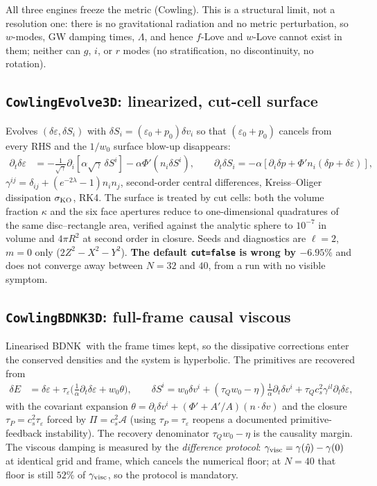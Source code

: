 \documentclass[aps,prd,preprint,amsmath,amssymb,nofootinbib,longbibliography]{revtex4-2}
\newcommand{\cs}{c_s}
\newcommand{\BDNK}{BDNK}
\begin{document}
All three engines freeze the metric (Cowling). This is a structural limit, not a resolution one:
there is no gravitational radiation and no metric perturbation, so $w$-modes, GW damping times,
$\Lambda$, and hence $f$-Love and $w$-Love cannot exist in them; neither can $g$, $i$, or $r$
modes (no stratification, no discontinuity, no rotation).

\subsection{\texttt{CowlingEvolve3D}: linearized, cut-cell surface}
Evolves $(\delta\varepsilon, \delta S_i)$ with $\delta S_i = (\varepsilon_0+p_0)\delta v_i$ so that
$(\varepsilon_0+p_0)$ cancels from every RHS and the $1/w_0$ surface blow-up disappears:
\begin{align}
\partial_t\delta\varepsilon &= -\frac{1}{\sqrt\gamma}\partial_i[\alpha\sqrt\gamma\,\delta S^i] - \alpha\Phi'(n_i\delta S^i),\qquad
\partial_t\delta S_i = -\alpha[\partial_i\delta p + \Phi' n_i(\delta p + \delta\varepsilon)],
\end{align}
$\gamma^{ij} = \delta_{ij} + (e^{-2\lambda}-1)n_in_j$, second-order central differences,
Kreiss--Oliger dissipation $\sigma_{\rm KO}$, RK4. The surface is treated by cut cells: both the
volume fraction $\kappa$ and the six face apertures reduce to one-dimensional quadratures of the
same disc--rectangle area, verified against the analytic sphere to $10^{-7}$ in volume and
$4\pi R^2$ at second order in closure. Seeds and diagnostics are $\ell=2$, $m=0$ only
($2Z^2-X^2-Y^2$). \textbf{The default \texttt{cut=false} is wrong by $-6.95\%$} and does not
converge away between $N=32$ and $40$, from a run with no visible symptom.

\subsection{\texttt{CowlingBDNK3D}: full-frame causal viscous}
Linearised \BDNK\ with the frame times kept, so the dissipative corrections enter the conserved
densities and the system is hyperbolic. The primitives are recovered from
\begin{align}
\delta E &= \delta\varepsilon + \tau_\varepsilon\big(\tfrac1\alpha\partial_t\delta\varepsilon + w_0\theta\big),\qquad
\delta S^i = w_0\delta v^i + (\tau_Qw_0-\eta)\tfrac1\alpha\partial_t\delta v^i + \tau_Q\cs^2\gamma^{il}\partial_l\delta\varepsilon,
\end{align}
with the covariant expansion $\theta = \partial_i\delta v^i + (\Phi' + A'/A)(n\cdot\delta v)$ and
the closure $\tau_P = \cs^2\tau_\varepsilon$ forced by $\Pi = \cs^2\mathcal A$ (using
$\tau_P = \tau_\varepsilon$ reopens a documented primitive-feedback instability). The recovery
denominator $\tau_Qw_0 - \eta$ is the causality margin. The viscous damping is measured by the
\emph{difference protocol}: $\gamma_{\rm visc} = \gamma(\hat\eta) - \gamma(0)$ at identical grid and
frame, which cancels the numerical floor; at $N=40$ that floor is still $52\%$ of
$\gamma_{\rm visc}$, so the protocol is mandatory.
\end{document}
